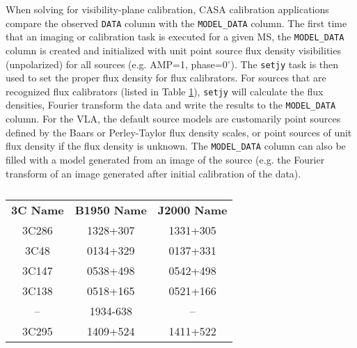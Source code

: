 When solving for visibility-plane calibration, CASA calibration applications
compare the observed {\tt DATA} column with the {\tt MODEL\_DATA} column.
The first time that an imaging or calibration task is executed for a
given MS, the {\tt MODEL\_DATA} column is created and initialized with unit
point source flux density visibilities (unpolarized) for all sources
(e.g. AMP=1, phase=0$^{\circ}$).  The {\tt setjy} task is
then used to set the proper flux density for flux calibrators.  For
sources that are recognized flux calibrators (listed in Table
\ref{table:fluxcal-table}), {\tt setjy} will calculate the flux
densities, Fourier transform the data and write the results to the
{\tt MODEL\_DATA} column.  For the VLA, the default source models are
customarily point sources defined by the Baars or Perley-Taylor flux
density scales, or point sources of unit flux density if the flux
density is unknown.  The {\tt MODEL\_DATA} column can also be filled with a
model generated from an image of the source (e.g. the Fourier
transform of an image generated after initial calibration of the
data).

\vspace{5mm}
\begin{table}[h!]
\caption[Recognized Flux Density Calibrators.]
        {\label{table:fluxcal-table}}
\begin{center}
\begin{tabular}{|ccc|} \hline
{\bf 3C Name}  & {\bf B1950 Name}& {\bf J2000 Name} \\
  3C286        &  1328+307       &  1331+305        \\
  3C48         &  0134+329       &  0137+331        \\
  3C147        &  0538+498       &  0542+498        \\
  3C138        &  0518+165       &  0521+166        \\
  --           &  1934-638       &    --            \\
  3C295        &  1409+524       &  1411+522        \\
\hline
\end{tabular}
\end{center}
\end{table}

